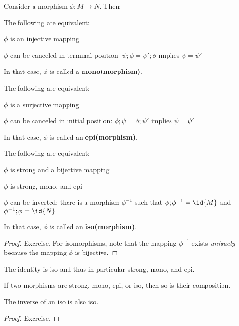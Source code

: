 \begin{theorem}
Consider a morphism $\phi:M\to N$.
Then:
\begin{compactitem}
\item The following are equivalent:
	\begin{compactitem}
	\item $\phi$ is an injective mapping
	\item $\phi$ can be canceled in terminal position: $\psi;\phi=\psi';\phi$ implies $\psi=\psi'$
	\end{compactitem}
	In that case, $\phi$ is called a \textbf{mono(morphism)}.
\item The following are equivalent:
	\begin{compactitem}
	\item $\phi$ is a surjective mapping
	\item $\phi$ can be canceled in initial position: $\phi;\psi=\phi;\psi'$ implies $\psi=\psi'$
	\end{compactitem}
	In that case, $\phi$ is called an \textbf{epi(morphism)}.
\item The following are equivalent:
	\begin{compactitem}
	\item $\phi$ is strong and a bijective mapping
	\item $\phi$ is strong, mono, and epi
	\item $\phi$ can be inverted: there is a morphism $\phi^{-1}$ such that $\phi;\phi^{-1}=\id{M}$ and $\phi^{-1};\phi=\id{N}$
	\end{compactitem}
	In that case, $\phi$ is called an \textbf{iso(morphism)}.
\end{compactitem}
\end{theorem}
\begin{proof}
Exercise.
For isomorphisms, note that the mapping $\phi^{-1}$ exists \emph{uniquely} because the mapping $\phi$ is bijective.
\end{proof}

\begin{theorem}
The identity is iso and thus in particular strong, mono, and epi.

If two morphisms are strong, mono, epi, or iso, then so is their composition.

The inverse of an iso is also iso.
\end{theorem}
\begin{proof}
Exercise.
\end{proof}


